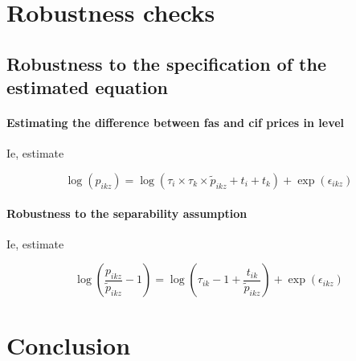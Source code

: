 \documentclass[a4paper,11pt]{article}
\begin{document}
\section{Robustness checks}

\subsection{Robustness to the specification of the estimated equation}


\paragraph{Estimating the difference between fas and cif prices in level}

Ie, estimate

$$\log(p_{ikz})= \log(\tau_i\times \tau_k \times \widetilde{p}_{ikz}+ t_i+ t_k)+ \exp(\epsilon_{ikz})$$

\paragraph{Robustness to the separability assumption}


Ie, estimate


$$\log(\frac{p_{ikz}}{\widetilde{p}_{ikz}} -1)= \log(\tau_{ik} -1+ \frac{t_{ik}}{\widetilde{p}_{ikz}})+ \exp(\epsilon_{ikz})$$

\section{Conclusion \label{sec:conclu}}
\end{document}
